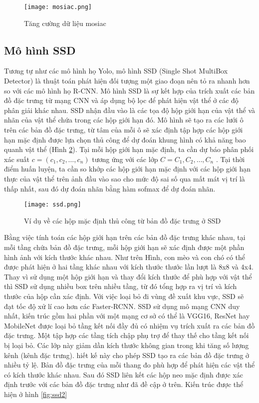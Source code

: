 \documentclass[../the.tex]{subfiles}
\begin{document}
\begin{figure}[H]
	\centering
	\texttt{[image: mosiac.png]}
	\caption[]{Tăng cường dữ liệu mosiac\footnotemark}
	\label{fig:mosaic}
\end{figure}


\subsection{Mô hình SSD}
\label{sec:ssd}
{\fontsize{13}{12} \selectfont
	Tương tự như các mô hình họ Yolo, mô hình SSD \cite{Liu_2016} (Single Shot MultiBox Detector) là thuật toán phát hiện đối tượng một giao đoạn nên tỏ ra nhanh hơn so với các mô hình họ R-CNN.
	Mô hình SSD là sự kết hợp của trích xuất các bản đồ đặc trưng từ mạng CNN và áp dụng bộ lọc để phát hiện vật thể ở các độ phân giải khác nhau. SSD nhận đầu vào là các tọa độ hộp giới hạn của vật thể và nhãn của vật thể chứa trong các hộp giới hạn đó.
	Mô hình sẽ tạo ra các lưới ô trên các bản đồ đặc trưng, từ tâm của mỗi ô sẽ xác định tập hợp các hộp giới hạn mặc định được lựa chọn thủ công để dự đoán khung hình có khả năng bao quanh vật thể (Hình \ref{fig:ssd}).
	Tại mỗi hộp giới hạn mặc định, ta cần dự báo phân phối xác suất $c = (c_1, c_2,\dots, c_n)$ tương ứng với các lớp $C= C_1, C_2,\dots,C_n $ . Tại thời điểm huấn luyện, ta cần so khớp các hộp giới hạn mặc định với các hộp giới hạn thực của vật thể trên ảnh đầu vào sao cho mức độ sai số qua mất mát vị trí là thấp nhất, sau đó dự đoán nhãn bằng hàm sofmax để dự đoán nhãn.
}

\begin{figure}[H]
	\centering
	\texttt{[image: ssd.png]}
	\caption{Ví dụ về các hộp mặc định thủ công từ bản đồ đặc trưng ở SSD \cite{Liu_2016}}
	\label{fig:ssd}
\end{figure}

{\fontsize{13}{12} \selectfont
	Bằng việc tính toán các hộp giới hạn trên các bản đồ đặc trưng khác nhau, tại mỗi tầng chứa bản đồ đặc trưng, mỗi hộp giới hạn sẽ xác định được một phần hình ảnh với kích thước khác nhau. Như trên Hình, con mèo và con chó có thể được phát hiện ở hai tầng khác nhau với kích thước thước lần lượt là 8x8 và 4x4. Thay vì sử dụng một hộp giới hạn và thay đổi kích thước để phù hợp với vật thể thì SSD sử dụng nhiều box trên nhiều tầng, từ đó tổng hợp ra vị trí và kích thước của hộp cần xác định. Với việc loại bỏ đi vùng đề xuất khu vực, SSD sẽ đạt tốc độ xử lí cao hơn các Faster-RCNN.
	SSD sử dụng mô mạng CNN duy nhất, kiến trúc gồm hai phần với một mạng cơ sở có thể là VGG16, ResNet hay MobileNet được loại bỏ tầng kết nối đầy đủ có nhiệm vụ trích xuất ra các bản đồ đặc trưng.
	Một tập hợp các tầng tích chập phụ trợ để thay thế cho tầng kết nối bị loại bỏ. Các lớp này giảm dần kích thước không gian trong khi tăng số lượng kênh (kênh đặc trưng). hiết kế này cho phép SSD tạo ra các bản đồ đặc trưng ở nhiều tỷ lệ. Bản đồ đặc trưng của mỗi thang đo phù hợp để phát hiện các vật thể có kích thước khác nhau.
	Sau đó SSD liên kết các hộp neo mặc định được xác định trước với các bản đồ đặc trưng như đã đề cập ở trên.
	Kiến trúc được thể hiện ở hình \ref{fig:ssd2}
}
\end{document}
